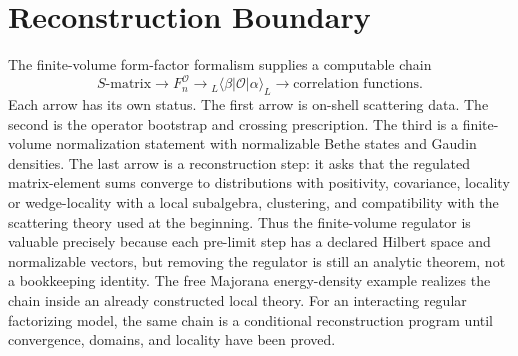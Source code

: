 \section{Reconstruction Boundary}

The finite-volume form-factor formalism supplies a computable chain
\[
  S\text{-matrix}
  \longrightarrow
  F_n^{\mathcal O}
  \longrightarrow
  {}_L\!\langle\beta|\mathcal O|\alpha\rangle_L
  \longrightarrow
  \text{correlation functions}.
\]
Each arrow has its own status.  The first arrow is on-shell scattering data.
The second is the operator bootstrap and crossing prescription.  The third is
a finite-volume normalization statement with normalizable Bethe states and
Gaudin densities.  The last arrow is a reconstruction step: it asks that the
regulated matrix-element sums converge to distributions with positivity,
covariance, locality or wedge-locality with a local subalgebra, clustering,
and compatibility with the scattering theory used at the beginning.  Thus the
finite-volume regulator is valuable precisely because each pre-limit step has
a declared Hilbert space and normalizable vectors, but removing the regulator
is still an analytic theorem, not a bookkeeping identity.  The free Majorana
energy-density example realizes the chain inside an already constructed local
theory.  For an interacting regular factorizing model, the same chain is a
conditional reconstruction program until convergence, domains, and locality
have been proved.

